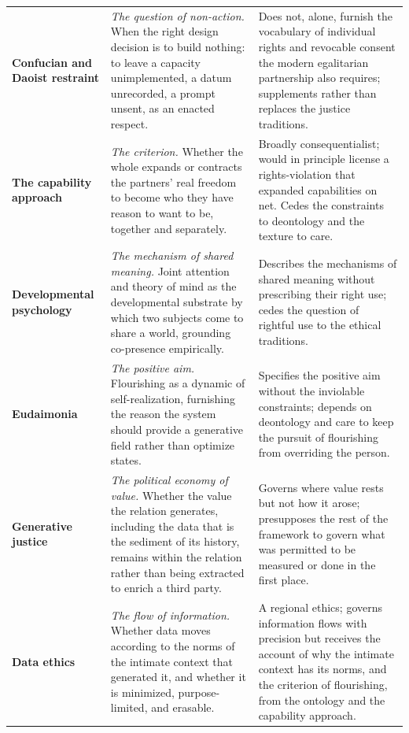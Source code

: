 \begin{small}
\begin{longtable}{@{}>{\raggedright\arraybackslash}p{} >{\raggedright\arraybackslash}p{} >{\raggedright\arraybackslash}p{}@{}}
\textbf{Confucian and Daoist restraint} \parencite{ames2011confucian, tu1985confucian} & \emph{The question of non-action.} When the right design decision is to build nothing: to leave a capacity unimplemented, a datum unrecorded, a prompt unsent, as an enacted respect. & Does not, alone, furnish the vocabulary of individual rights and revocable consent the modern egalitarian partnership also requires; supplements rather than replaces the justice traditions.\\

\textbf{The capability approach} \parencite{sen1999development, nussbaum2000women} & \emph{The criterion.} Whether the whole expands or contracts the partners' real freedom to become who they have reason to want to be, together and separately. & Broadly consequentialist; would in principle license a rights-violation that expanded capabilities on net. Cedes the constraints to deontology and the texture to care.\\

\textbf{Developmental psychology} \parencite{tomasello1999cultural, premack1978does} & \emph{The mechanism of shared meaning.} Joint attention and theory of mind as the developmental substrate by which two subjects come to share a world, grounding co-presence empirically. & Describes the mechanisms of shared meaning without prescribing their right use; cedes the question of rightful use to the ethical traditions.\\

\textbf{Eudaimonia} \parencite{ryff1995structure} & \emph{The positive aim.} Flourishing as a dynamic of self-realization, furnishing the reason the system should provide a generative field rather than optimize states. & Specifies the positive aim without the inviolable constraints; depends on deontology and care to keep the pursuit of flourishing from overriding the person.\\

\textbf{Generative justice} \parencite{eglash2016generative, marx1867capital} & \emph{The political economy of value.} Whether the value the relation generates, including the data that is the sediment of its history, remains within the relation rather than being extracted to enrich a third party. & Governs where value rests but not how it arose; presupposes the rest of the framework to govern what was permitted to be measured or done in the first place.\\

\textbf{Data ethics} \parencite{nissenbaum2010privacy} & \emph{The flow of information.} Whether data moves according to the norms of the intimate context that generated it, and whether it is minimized, purpose-limited, and erasable. & A regional ethics; governs information flows with precision but receives the account of why the intimate context has its norms, and the criterion of flourishing, from the ontology and the capability approach.\\


\end{longtable}
\end{small}
